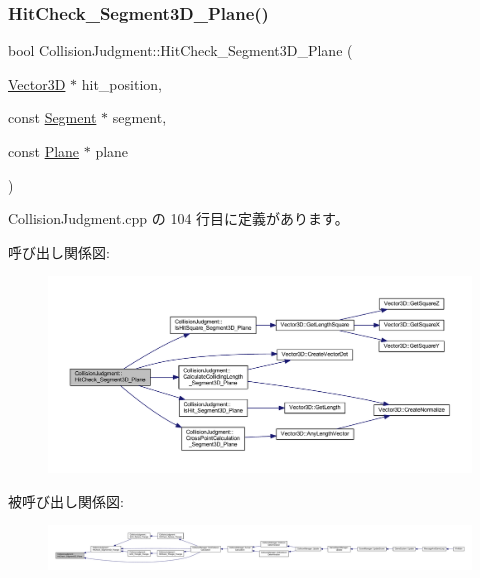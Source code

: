 \subsubsection{\texorpdfstring{Hit\+Check\+\_\+\+Segment3\+D\+\_\+\+Plane()}{HitCheck\_Segment3D\_Plane()}}
{\footnotesize\ttfamily bool Collision\+Judgment\+::\+Hit\+Check\+\_\+\+Segment3\+D\+\_\+\+Plane (\begin{DoxyParamCaption}\item[{\mbox{\hyperlink{class_vector3_d}{Vector3D}} $\ast$}]{hit\+\_\+position,  }\item[{const \mbox{\hyperlink{class_segment}{Segment}} $\ast$}]{segment,  }\item[{const \mbox{\hyperlink{class_plane}{Plane}} $\ast$}]{plane }\end{DoxyParamCaption})\hspace{0.3cm}{\ttfamily [static]}}



 Collision\+Judgment.\+cpp の 104 行目に定義があります。

呼び出し関係図\+:\nopagebreak
\begin{figure}[H]
\begin{center}
\leavevmode
\includegraphics[width=350pt]{class_collision_judgment_ac31167bc6d89d20f7220220ee3f21f4e_cgraph}
\end{center}
\end{figure}
被呼び出し関係図\+:
\nopagebreak
\begin{figure}[H]
\begin{center}
\leavevmode
\includegraphics[width=350pt]{class_collision_judgment_ac31167bc6d89d20f7220220ee3f21f4e_icgraph}
\end{center}
\end{figure}
\mbox{\label{class_collision_judgment_a92531c1254846a0a06ee7e95796f1070}} 
